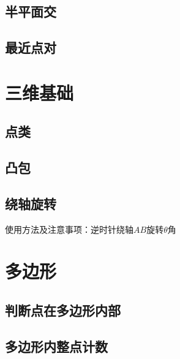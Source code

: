 \documentclass[openany, a4paper, 10pt]{book}
\begin{document}
\begin{spacing}{1.0}
			\subsection{半平面交}
				
			\subsection{最近点对}
				
		\section{三维基础}
			\subsection{点类}
				
			\subsection{凸包}
				
			\subsection{绕轴旋转}
				使用方法及注意事项：逆时针绕轴$AB$旋转$\theta$角
				
		\section{多边形}
			\subsection{判断点在多边形内部}
				
			\subsection{多边形内整点计数}
				

\end{spacing}
\end{document}
